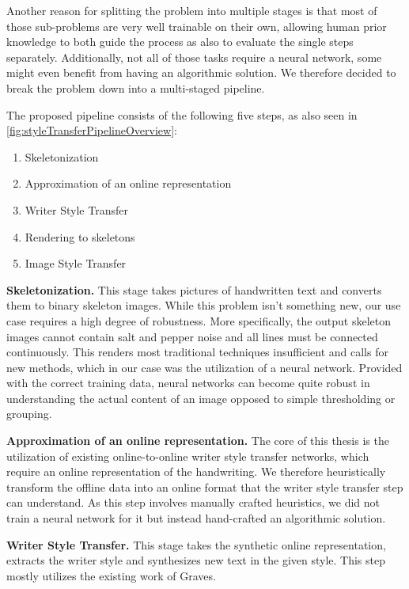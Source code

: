 Another reason for splitting the problem into multiple stages is that most of those sub-problems are very well trainable on their own, allowing human prior knowledge to both guide the process as also to evaluate the single steps separately. Additionally, not all of those tasks require a neural network, some might even benefit from having an algorithmic solution. We therefore decided to break the problem down into a multi-staged pipeline.

\pagebreak
The proposed pipeline consists of the following five steps, as also seen in \cref{fig:styleTransferPipelineOverview}:
\begin{enumerate}[topsep=0pt,itemsep=-1ex,partopsep=1ex,parsep=1ex]
\item Skeletonization
\item Approximation of an online representation
\item Writer Style Transfer
\item Rendering to skeletons
\item Image Style Transfer
\end{enumerate}

\textbf{Skeletonization.}
This stage takes pictures of handwritten text and converts them to binary skeleton images. While this problem isn't something new, our use case requires a high degree of robustness. More specifically, the output skeleton images cannot contain salt and pepper noise and all lines must be connected continuously. This renders most traditional techniques insufficient and calls for new methods, which in our case was the utilization of a neural network. Provided with the correct training data, neural networks can become quite robust in understanding the actual content of an image opposed to simple thresholding or grouping.

\textbf{Approximation of an online representation.}
The core of this thesis is the utilization of existing online-to-online writer style transfer networks, which require an online representation of the handwriting. We therefore heuristically transform the offline data into an online format that the writer style transfer step can understand. As this step involves manually crafted heuristics, we did not train a neural network for it but instead hand-crafted an algorithmic solution.

\textbf{Writer Style Transfer.}
This stage takes the synthetic online representation, extracts the writer style and synthesizes new text in the given style. This step mostly utilizes the existing work of Graves.~\cite{graves}

